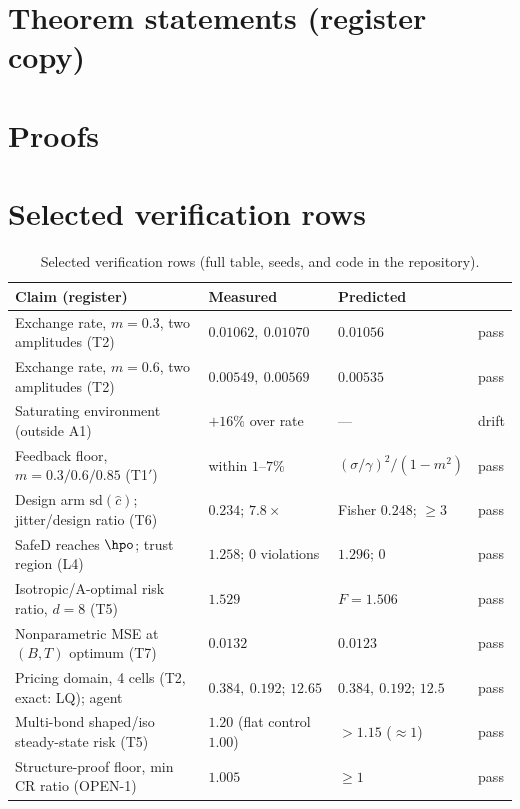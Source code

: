 \documentclass{article}
\begin{document}



\clearpage
\appendix

\section{Theorem statements (register copy)}
\label{app:theorems}


\section{Proofs}
\label{app:proofs}


\section{Selected verification rows}
\label{app:table}

\begin{table}[h]
\centering
\small
\caption{Selected verification rows (full table, seeds, and code in the repository).}
\label{tab:results}
\begin{tabular}{@{}llll@{}}
\toprule
Claim (register) & Measured & Predicted & \\
\midrule
Exchange rate, $m{=}0.3$, two amplitudes (T2) & $0.01062,\ 0.01070$ & $0.01056$ & pass \\
Exchange rate, $m{=}0.6$, two amplitudes (T2) & $0.00549,\ 0.00569$ & $0.00535$ & pass \\
Saturating environment (outside A1) & $+16\%$ over rate & --- & drift \\
Feedback floor, $m{=}0.3/0.6/0.85$ (T1$'$) & within $1$--$7\%$ & $(\sigma/\gamma)^2/(1{-}m^2)$ & pass \\
Design arm $\mathrm{sd}(\hat c)$; jitter/design ratio (T6) & $0.234$; $7.8\times$ & Fisher $0.248$; $\ge 3$ & pass \\
SafeD reaches $\hpo$; trust region (L4) & $1.258$; $0$ violations & $1.296$; $0$ & pass \\
Isotropic/A-optimal risk ratio, $d{=}8$ (T5) & $1.529$ & $F = 1.506$ & pass \\
Nonparametric MSE at $(B,T)$ optimum (T7) & $0.0132$ & $0.0123$ & pass \\
Pricing domain, 4 cells (T2, exact: LQ); agent & $0.384,\ 0.192$; $12.65$ & $0.384,\ 0.192$; $12.5$ & pass \\
Multi-bond shaped/iso steady-state risk (T5) & $1.20$ (flat control $1.00$) & $>1.15$ ($\approx 1$) & pass \\
Structure-proof floor, min CR ratio (OPEN-1) & $1.005$ & $\ge 1$ & pass \\
\bottomrule
\end{tabular}
\end{table}
\end{document}
